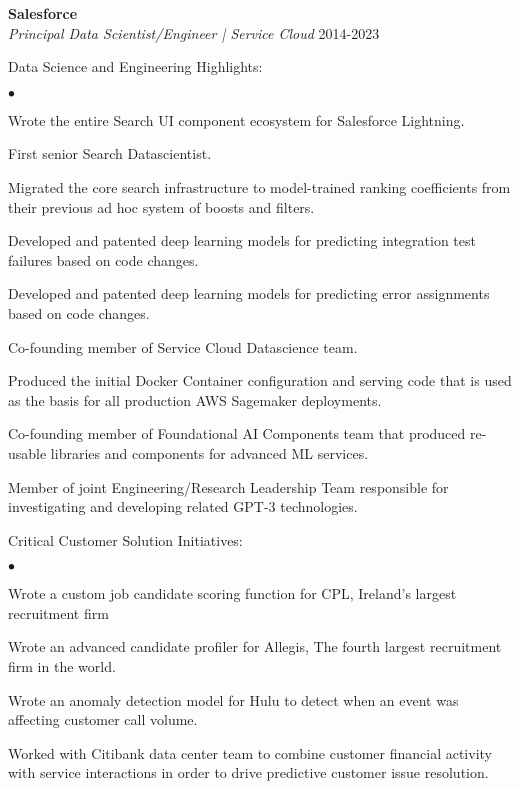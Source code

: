 \documentclass[margin,line]{res}
\newenvironment{list2}{
  \begin{list}{$\bullet$}{%
      \setlength{\itemsep}{0in}
      \setlength{\parsep}{0in} \setlength{\parskip}{0in}
      \setlength{\topsep}{0in} \setlength{\partopsep}{0in} 
      \setlength{\leftmargin}{0.2in}}}{\end{list}}
\begin{document}
\begin{resume}
{\bf Salesforce} \\
{\em Principal Data Scientist/Engineer | Service Cloud} \hfill 2014-2023

Data Science and Engineering Highlights:
\begin{list2}
  \item Wrote the entire Search UI component ecosystem for Salesforce Lightning.
  \item First senior Search Datascientist.
  \item Migrated the core search infrastructure to model-trained ranking coefficients from their previous ad hoc system of boosts and filters.
  \item Developed and patented deep learning models for predicting integration test failures based on code changes.
  \item Developed and patented deep learning models for predicting error assignments based on code changes.
  \item Co-founding member of Service Cloud Datascience team.
  \item Produced the initial Docker Container configuration and serving code that is used as the basis for all production AWS Sagemaker deployments.
  \item Co-founding member of Foundational AI Components team that produced re-usable libraries and components for advanced ML services.
  \item Member of joint Engineering/Research Leadership Team responsible for investigating and developing related GPT-3 technologies.
\end{list2}

Critical Customer Solution Initiatives:
  \begin{list2}
  \item Wrote a custom job candidate scoring function for CPL, Ireland’s largest recruitment firm
  \item Wrote an advanced candidate profiler for Allegis, The fourth largest recruitment firm in the world.
  \item Wrote an anomaly detection model for Hulu to detect when an event was affecting customer call volume.
  \item Worked with Citibank data center team to combine customer financial activity with service interactions in order to drive predictive customer issue resolution.
\end{list2}


\vspace{20px}


\end{resume}
\end{document}

